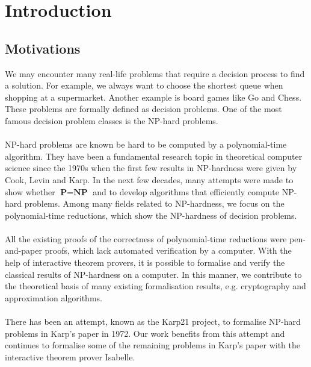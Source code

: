 \chapter{Introduction}\label{chapter:introduction}
\section{Motivations}
We may encounter many real-life problems that require a decision process to find a solution. 
For example, we always want to choose the shortest queue when shopping at a supermarket. 
Another example is board games like Go and Chess. These problems are formally defined as decision problems.
One of the most famous decision problem classes is the NP-hard problems. \\\\
NP-hard problems are known be hard to be computed by a polynomial-time algorithm. 
They have been a fundamental research topic in theoretical computer science since the 1970s
when the first few results in NP-hardness were given by Cook\cite{cook2023complexity}, Levin\cite{levin1973universal} 
and Karp\cite{karp2010reducibility}. 
In the next few decades, many attempts were made to show whether $\textbf{P} = \textbf{NP}$ and to develop algorithms that efficiently compute NP-hard problems. 
Among many fields related to NP-hardness, we focus on the polynomial-time reductions, which show the NP-hardness of decision problems. \\\\
All the existing proofs of the correctness of polynomial-time reductions were pen-and-paper proofs, 
which lack automated verification by a computer. 
With the help of interactive theorem provers, 
it is possible to formalise and verify the classical results of NP-hardness on a computer.
In this manner, we contribute to the theoretical basis of many existing formalisation results, 
e.g. cryptography and approximation algorithms. \\\\ 
There has been an attempt, known as the Karp21 project, to formalise NP-hard problems in Karp's paper in 1972. 
Our work benefits from this attempt and continues to formalise some of the remaining problems in Karp's paper 
with the interactive theorem prover Isabelle. 

